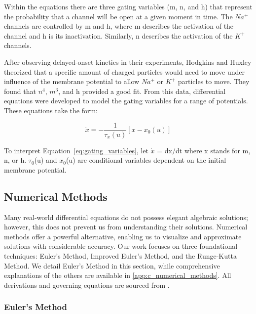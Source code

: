 \documentclass{article} %
\begin{document}
\begin{multicols}{2}
Within the equations there are three gating variables (m, n, and h) that represent the probability that a channel will be open at a given moment in time. 
The $Na^+$ channels are controlled by m and h, where m describes the activation of the channel and h is its inactivation. 
Similarly, n describes the activation of the $K^+$ channels.

After observing delayed-onset kinetics in their experiments, Hodgkins and Huxley theorized that a specific amount of charged particles would need to move under influence of the membrane potential to allow $Na^+$ or $K^+$ particles to move.
 They found that $n^4$, $m^3$, and h provided a good fit. 
From this data, differential equations were developed to model the gating variables for a range of potentials. 
These equations take the form:

\begin{dmath}
    \dot{x} = -\frac{1}{\tau_{x}(u)}[x - x_{0}(u)]
    \label{eq:gating_variables}
\end{dmath}

To interpret Equation~\ref{eq:gating_variables}, let $\dot{x}$ = dx/dt where x stands for m, n, or h. $\tau_0$(u) and $x_0$(u) are conditional variables dependent on the initial membrane potential.

\subsection{Numerical Methods}
\label{subsec:numerical_methods}

Many real-world differential equations do not possess elegant algebraic solutions; however, this does not prevent us from understanding their solutions. 
Numerical methods offer a powerful alternative, enabling us to visualize and approximate solutions with considerable accuracy. 
Our work focuses on three foundational techniques: Euler's Method, Improved Euler's Method, and the Runge-Kutta Method. 
We detail Euler's Method in this section, while comprehensive explanations of the others are available in \ref{app:c_numerical_methods}. 
All derivations and governing equations are sourced from \cite{brannan2015differential}.

\subsubsection{Euler's Method}
\label{subsubsec:euler_method}


\end{multicols}
\end{document}
